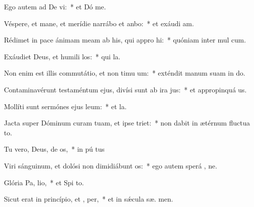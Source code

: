 \item Ego autem ad De vi:~* et Dó  me.
\item Véspere, et mane, et merídie narrábo et anbo:~* et exáudi  am.
\item Rédimet in pace ánimam meam ab his, qui appro hi:~* quóniam inter mul  cum.
\item Exáudiet Deus, et humili los:~* qui   la.
\item Non enim est illis commutátio, et non timu um:~* exténdit manum suam in do.
\item Contaminavérunt testaméntum ejus, divísi sunt ab ira  jus:~* et appropinquá  us.
\item Mollíti sunt sermónes ejus  leum:~* et   la.
\item Jacta super Dóminum curam tuam, et ipse  triet:~* non dabit in ætérnum fluctua to.
\item Tu vero, Deus, de os,~* in pú tus
\item Viri sánguinum, et dolósi non dimidiábunt  os:~* ego autem sperá  , ne.
\item Glória Pa,  lio,~* et Spi to.
\item Sicut erat in princípio, et ,  per,~* et in sǽcula sæ. men.
